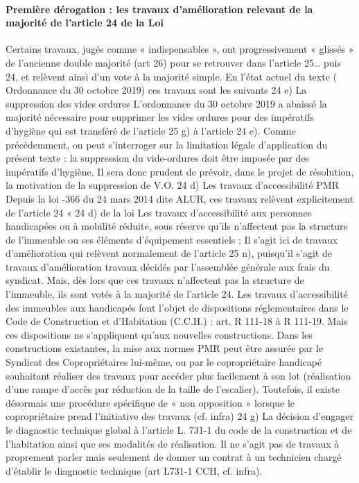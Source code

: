 			\paragraph{Première dérogation : les travaux d’amélioration relevant de la majorité de l’article 24 de la Loi}
			
				Certains travaux, jugés comme « indispensables », ont progressivement « glissés » de l’ancienne double majorité (art 26) pour se retrouver dans l’article 25… puis 24, et relèvent ainsi d’un vote à la majorité simple. En l’état actuel du texte ( Ordonnance du 30 octobre 2019) ces travaux sont les suivants
				24 e) La suppression des vides ordures
				L’ordonnance du 30 octobre 2019 a abaissé la majorité nécessaire pour supprimer les vides ordures pour des impératifs d’hygiène qui est transféré de l’article 25 g) à l’article 24 e). Comme précédemment, on peut s’interroger sur la limitation légale d’application du présent texte : la suppression du vide-ordures doit être imposée par des impératifs d’hygiène. Il sera donc prudent de prévoir, dans le projet de résolution, la motivation de la suppression de V.O.
				24 d) Les travaux d’accessibilité PMR
				Depuis la loi -366 du 24 mars 2014 dite ALUR, ces travaux relèvent explicitement de l’article 24
				« 24 d) de la loi Les travaux d’accessibilité aux personnes handicapées ou à mobilité réduite, sous réserve qu’ils n’affectent pas la structure de l’immeuble ou ses éléments d’équipement essentiels ;
				Il s’agit ici de travaux d’amélioration qui relèvent normalement de l’article 25 n), puisqu’il s’agit de travaux d’amélioration travaux décidés par l’assemblée générale aux frais du syndicat. Mais, dès lors que ces travaux n’affectent pas la structure de l’immeuble, ils sont votés à la majorité de l’article 24.
				Les travaux d’accessibilité des immeubles aux handicapés font l’objet de dispositions réglementaires dans le Code de Construction et d’Habitation (C.C.H.) : art. R 111-18 à R 111-19. Mais ces dispositions ne s’appliquent qu’aux nouvelles constructions.
				Dans les constructions existantes, la mise aux normes PMR peut être assurée par le Syndicat des Copropriétaires lui-même, ou par le copropriétaire handicapé souhaitant réaliser des travaux pour accéder plus facilement à son lot (réalisation d’une rampe d’accès par réduction de la taille de l’escalier). Toutefois, il existe désormais une procédure spécifique de « non opposition » lorsque le copropriétaire prend l’initiative des travaux (cf. infra)
				24 g) La décision d’engager le diagnostic technique global à l’article L. 731-1 du code de la construction et de l’habitation ainsi que ses modalités de réalisation.
				Il ne s’agit pas de travaux à proprement parler mais seulement de donner un contrat à un technicien chargé d’établir le diagnostic technique (art L731-1 CCH, cf. infra).
			
